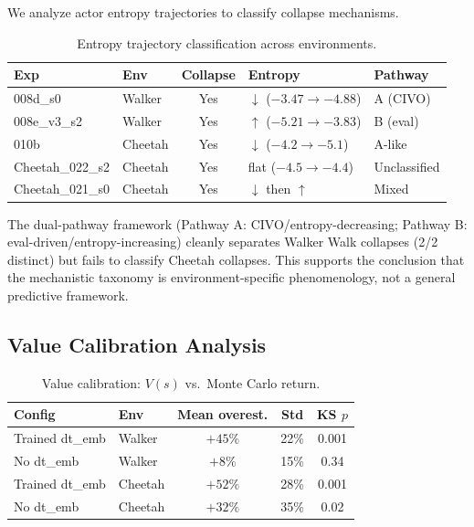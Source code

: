 \documentclass[10pt,twocolumn]{article}
\begin{document}
We analyze actor entropy trajectories to classify collapse mechanisms.

\begin{table}[h]
\centering
\caption{Entropy trajectory classification across environments.}
\label{tab:entropy}
\begin{tabular}{llcll}
\toprule
Exp & Env & Collapse & Entropy & Pathway \\
\midrule
008d\_s0 & Walker & Yes & $\downarrow$ ($-3.47 \to -4.88$) & A (CIVO) \\
008e\_v3\_s2 & Walker & Yes & $\uparrow$ ($-5.21 \to -3.83$) & B (eval) \\
010b & Cheetah & Yes & $\downarrow$ ($-4.2 \to -5.1$) & A-like \\
Cheetah\_022\_s2 & Cheetah & Yes & flat ($-4.5 \to -4.4$) & Unclassified \\
Cheetah\_021\_s0 & Cheetah & Yes & $\downarrow$ then $\uparrow$ & Mixed \\
\bottomrule
\end{tabular}
\end{table}

The dual-pathway framework (Pathway A: CIVO/entropy-decreasing; Pathway B: eval-driven/entropy-increasing) cleanly separates Walker Walk collapses (2/2 distinct) but fails to classify Cheetah collapses. This supports the conclusion that the mechanistic taxonomy is environment-specific phenomenology, not a general predictive framework.

\subsection{Value Calibration Analysis}
\label{sec:value-calib}

\begin{table}[h]
\centering
\caption{Value calibration: $V(s)$ vs.\ Monte Carlo return.}
\label{tab:value-calib}
\begin{tabular}{llccc}
\toprule
Config & Env & Mean overest. & Std & KS $p$ \\
\midrule
Trained dt\_emb & Walker & $+45\%$ & 22\% & 0.001 \\
No dt\_emb & Walker & $+8\%$ & 15\% & 0.34 \\
Trained dt\_emb & Cheetah & $+52\%$ & 28\% & 0.001 \\
No dt\_emb & Cheetah & $+32\%$ & 35\% & 0.02 \\
\bottomrule
\end{tabular}
\end{table}
\end{document}
